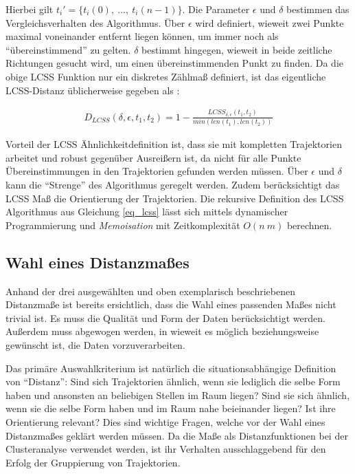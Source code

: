 Hierbei gilt $t_i' = \{ t_i(0),\ ...,\ t_i(n-1)\}$.
Die Parameter $\epsilon$ und $\delta$ bestimmen das
Vergleichsverhalten des Algorithmus. Über $\epsilon$ wird definiert, wieweit zwei Punkte maximal voneinander entfernt liegen
können, um immer noch als ``übereinstimmend'' zu gelten. $\delta$ bestimmt hingegen, wieweit in beide zeitliche Richtungen
gesucht wird, um einen übereinstimmenden Punkt zu finden.
Da die obige LCSS Funktion nur ein diskretes Zählmaß definiert, ist das eigentliche LCSS-Distanz üblicherweise
gegeben als \cite[]{Vlachos2002}:

\begin{ceqn}
\begin{align}
\label{eq_lcss_distance}
    D_{LCSS}(\delta, \epsilon, t_1, t_2) = 1 - \frac{LCSS_{\delta, \epsilon}(t_1, t_2)}{min(len(t_1), len(t_2))}
\end{align}
\end{ceqn}


Vorteil der LCSS Ähnlichkeitdefinition ist, dass sie mit kompletten Trajektorien arbeitet und robust
gegenüber Ausreißern ist, da nicht für alle Punkte Übereinstimmungen in den Trajektorien gefunden werden müssen.
Über $\epsilon$ und $\delta$ kann die ``Strenge'' des Algorithmus geregelt werden.
Zudem berücksichtigt das LCSS Maß die Orientierung der Trajektorien.
Die rekursive Definition des LCSS Algorithmus aus Gleichung \ref{eq_lcss} lässt sich mittels dynamischer Programmierung
und \textit{Memoisation} mit Zeitkomplexität $O(n\ m)$ berechnen.

\subsection{Wahl eines Distanzmaßes}

Anhand der drei ausgewählten und oben exemplarisch beschriebenen Distanzmaße ist bereits ersichtlich,
dass die Wahl eines passenden Maßes nicht trivial ist. Es muss die Qualität und Form der Daten berücksichtigt werden.
Außerdem muss abgewogen werden, in wieweit es möglich beziehungsweise gewünscht ist, die Daten vorzuverarbeiten.

Das primäre Auswahlkriterium ist natürlich die situationsabhängige Definition von ``Distanz'':
Sind sich Trajektorien ähnlich, wenn sie lediglich die selbe Form haben und ansonsten an beliebigen Stellen im Raum liegen?
Sind sie sich ähnlich, wenn sie die selbe Form haben und im Raum nahe beieinander liegen? Ist ihre Orientierung relevant?
Dies sind wichtige Fragen, welche vor der Wahl eines Distanzmaßes geklärt werden müssen.
Da die Maße als Distanzfunktionen bei der Clusteranalyse verwendet werden, ist ihr Verhalten ausschlaggebend
für den Erfolg der Gruppierung von Trajektorien.

